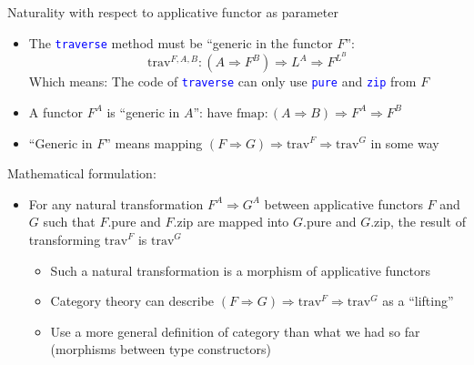 \documentclass[english]{beamer}
\begin{document}
\begin{frame}{Naturality with respect to applicative functor as parameter}
\begin{itemize}
\item \vspace{-0.15cm}The{\footnotesize{} }\texttt{\textcolor{blue}{\footnotesize{}traverse}}
method must be ``generic in the functor $F$'':{\footnotesize{}
\[
\text{trav}^{F,A,B}:(A\Rightarrow F^{B})\Rightarrow L^{A}\Rightarrow F^{L^{B}}
\]
}Which means: The code of \texttt{\textcolor{blue}{\footnotesize{}traverse}}
can only use \texttt{\textcolor{blue}{\footnotesize{}pure}} and \texttt{\textcolor{blue}{\footnotesize{}zip}}
from $F$
\item A functor {\footnotesize{}$F^{A}$ }is ``generic in $A$'': have
{\footnotesize{}$\text{fmap}:\left(A\Rightarrow B\right)\Rightarrow F^{A}\Rightarrow F^{B}$}{\footnotesize\par}
\item ``Generic in $F$'' means mapping {\footnotesize{}$\left(F\Rightarrow G\right)\Rightarrow\text{trav}^{F}\Rightarrow\text{trav}^{G}$}
in some way
\end{itemize}
Mathematical formulation:
\begin{itemize}
\item For any natural transformation $F^{A}\Rightarrow G^{A}$ between applicative
functors $F$ and $G$ such that $F.\text{pure}$ and $F.\text{zip}$
are mapped into $G.\text{pure}$ and $G.\text{zip}$, the result of
transforming $\text{trav}^{F}$ is $\text{trav}^{G}$
\begin{itemize}
\item Such a natural transformation is a morphism of applicative functors
\item Category theory can describe {\footnotesize{}$\left(F\Rightarrow G\right)\Rightarrow\text{trav}^{F}\Rightarrow\text{trav}^{G}$}
as a ``lifting''
\item Use a more general definition of category than what we had so far
(morphisms between type constructors)
\end{itemize}
\end{itemize}
\end{frame}
\end{document}
